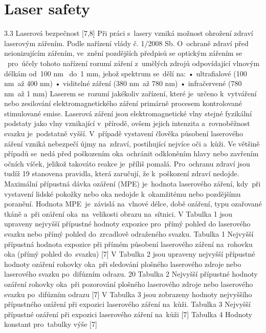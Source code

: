 \chapter{Laser safety}

3.3 Laserová bezpečnost [7,8]
Při práci  s~lasery vzniká možnost ohrožení zdraví laserovým zářením. Podle nařízení vlády
č. 1/2008 Sb.  O~ochraně zdraví před neionizujícím zářením, ve~znění pozdějších předpisů se
optickým zářením se ~pro~účely tohoto nařízení rozumí záření  z~umělých zdrojů odpovídající
vlnovým délkám od~100 nm ~do~1 mm, jehož spektrum se~dělí na:
• ultrafialové (100 nm~až 400 nm)
• viditelné záření (380 nm~až 780 nm)
• infračervené (780 nm~až 1 mm)
Laserem se~rozumí jakékoliv zařízení, které je~určeno  k~vytváření nebo zesilování
elektromagnetického záření primárně procesem kontrolované stimulované emise. Laserová
záření jsou elektromagnetické vlny stejné fyzikální podstaty jako vlny vznikající  v~přírodě,
ovšem jejich intenzita  a~rovnoběžnost svazku je~podstatně vyšší.  V~případě vystavení člověka
působení laserového záření vzniká nebezpečí újmy na~zdraví, postihující nejvíce oči  a~kůži.
Ve většině případů se~nedá před poškozením  oka~ochránit odkloněním hlavy nebo
zavřením očních víček, jelikož takováto reakce je~příliš pomalá.  Pro~ochranu zdraví jsou tudíž
19
stanovena pravidla, která zaručují, že  k~poškození zdraví nedojde. Maximální přípustná dávka
ozáření (MPE) je~hodnota laserového záření,  kdy~při vystavení lidské pokožky nebo oka
nedojde  k~okamžitému nebo pozdějšímu poranění. Hodnota  MPE~je~závislá na~vlnové délce,
době ozáření, typu ozařované tkáně  a~při ozáření  oka~na~velikosti obrazu na~sítnici.
V Tabulka 1 jsou upraveny nejvyšší přípustné hodnoty expozice  pro~přímý pohled do
laserového svazku nebo přímý pohled do~zrcadlově odraženého svazku.
Tabulka 1 Nejvyšší přípustná hodnota expozice při přímém působení laserového záření na~rohovku oka
(přímý pohled do~svazku) [7]
V Tabulka 2 jsou upraveny nejvyšší přípustné hodnoty ozáření rohovky  oka~při sledování
plošného laserového zdroje nebo laserového svazku po~difúzním odrazu.
20
Tabulka 2 Nejvyšší přípustné hodnoty ozáření rohovky  oka~při pozorování plošného laserového zdroje
nebo laserového svazku po~difúzním odrazu [7]
V Tabulka 3 jsou zobrazeny hodnoty nejvyššího přípustného ozáření při expozici
laserového záření na~kůži.
Tabulka 3 Nejvyšší přípustné ozáření při expozici laserového záření na~kůži [7]
Tabulka 4 Hodnoty konstant  pro~tabulky výše [7]
